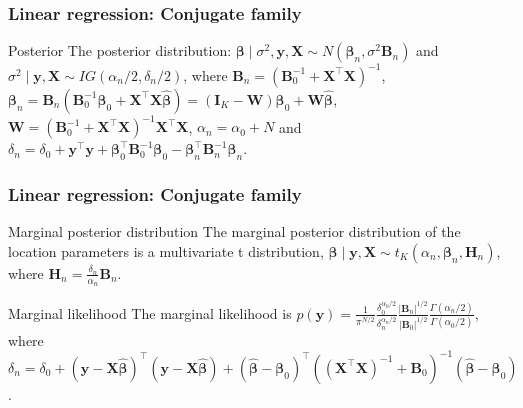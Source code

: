 \documentclass[12pt, compress]{beamer}
\begin{document}
\begin{frame}
	\frametitle{Linear regression: Conjugate family}
	\begin{block}{Posterior}
		The posterior distribution:
		$\bm{\beta}\mid \sigma^2, \bm{y}, \bm{X} \sim N(\bm{\beta}_n, \sigma^2\bm{B}_n)$ and $\sigma^2\mid  \bm{y}, \bm{X}\sim IG(\alpha_n/2, \delta_n/2)$, where $\bm{B}_n = (\bm{B}_0^{-1} + \bm{X}^{\top}\bm{X})^{-1}$, $\bm{\beta}_n = \bm{B}_n(\bm{B}_0^{-1}\bm{\beta}_0 + \bm{X}^{\top}\bm{X}\hat{\bm{\beta}})=(\bm{I}_K-{\bm{W}})\bm{\beta}_0+{\bm{W}}\hat{\bm{\beta}}$, ${\bm{W}}=({\bm{B}}_0^{-1} + {\bm{X}}^{\top}{\bm{X}})^{-1}{\bm{X}}^{\top}{\bm{X}}$, $\alpha_n = \alpha_0 + N$ and $\delta_n = \delta_0 + \bm{y}^{\top}\bm{y} + \bm{\beta}_0^{\top}\bm{B}_0^{-1}\bm{\beta}_0 - \bm{\beta}_n^{\top}\bm{B}_n^{-1}\bm{\beta}_n$.
	\end{block}
	
\end{frame}

\begin{frame}
	\frametitle{Linear regression: Conjugate family}
	\begin{block}{Marginal posterior distribution}
		The marginal posterior distribution of the location parameters is a multivariate t distribution, $\boldsymbol{\beta}\mid {\boldsymbol{y}},{\boldsymbol{X}} \sim t_K(\alpha_n, \boldsymbol{\beta}_n, {\boldsymbol{H}}_n)$, where ${\boldsymbol{H}}_n = \frac{\delta_n}{\alpha_n}{\boldsymbol{B}}_n$.
	\end{block}

\begin{block}{Marginal likelihood}
	The marginal likelihood is $p({\bm{y}})=\frac{1}{\pi^{N/2}}\frac{\delta_0^{\alpha_0/2}}{\delta_n^{\alpha_n/2}}\frac{|{\bm{B}}_n|^{1/2}}{|{\bm{B}}_0|^{1/2}}\frac{\Gamma(\alpha_n/2)}{\Gamma(\alpha_0/2)}$, where $\delta_n=\delta_0+({\bm{y}}-{\bm{X}}\hat{\bm{\beta}})^{\top}({\bm{y}}-{\bm{X}}\hat{\bm{\beta}})+(\hat{\bm{\beta}}-\bm{\beta}_0)^{\top}(({\bm{X}}^{\top}{\bm{X}})^{-1}+{\bm{B}}_0)^{-1}(\hat{\bm{\beta}}-\bm{\beta}_0)$.
\end{block}
\end{frame}
\end{document}

